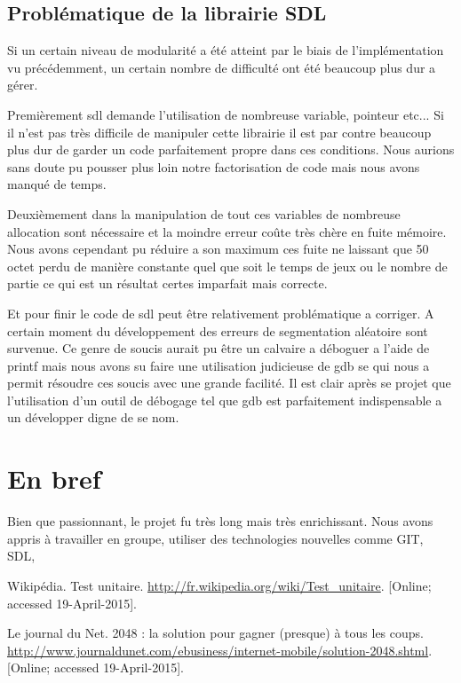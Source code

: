 \documentclass[12pt]{article}
\begin{document}
\subsection {Problématique de la librairie SDL}
Si un certain niveau de modularité a été atteint par le biais de l’implémentation vu
précédemment, un certain nombre de difficulté ont été beaucoup plus dur a gérer.
\par Premièrement sdl demande l'utilisation de nombreuse variable, pointeur etc...
Si il n'est pas très difficile de manipuler cette librairie il est par contre beaucoup plus
dur de garder un code parfaitement propre dans ces conditions.
Nous aurions sans doute pu pousser plus loin notre factorisation de code mais nous
avons manqué de temps.
\par Deuxièmement dans la manipulation de tout ces variables de nombreuse allocation sont
nécessaire et la moindre erreur coûte très chère en fuite mémoire.
Nous avons cependant pu réduire a son maximum ces fuite ne laissant que 50 octet
perdu de manière constante quel que soit le temps de jeux ou le nombre de partie ce qui est
un résultat certes imparfait mais correcte.
\par Et pour finir le code de sdl peut être relativement problématique a corriger. A certain
moment du développement des erreurs de segmentation aléatoire sont survenue.
Ce genre de soucis aurait pu être un calvaire a déboguer a l'aide de printf mais
nous avons su faire une utilisation judicieuse de gdb se qui nous a permit résoudre
ces soucis avec une grande facilité. Il est clair après se projet que l'utilisation d'un outil de débogage
tel que gdb est parfaitement indispensable a un développer digne de se nom.



\newpage
\section{En bref}
Bien que passionnant, le projet fu tr\`es long mais tr\`es enrichissant. Nous
avons appris \`a travailler en groupe, utiliser des technologies nouvelles comme
GIT, SDL, 
\newpage

\begin{thebibliography}{1}
   Wikip\'edia. Test unitaire.
  \url{http://fr.wikipedia.org/wiki/Test_unitaire}. [Online; accessed
  19-April-2015].

   Le journal du Net. 2048 : la solution pour gagner (presque) à
  tous les coups.
  \url{http://www.journaldunet.com/ebusiness/internet-mobile/solution-2048.shtml}. [Online; accessed 19-April-2015].
\end{thebibliography}
\end{document}
